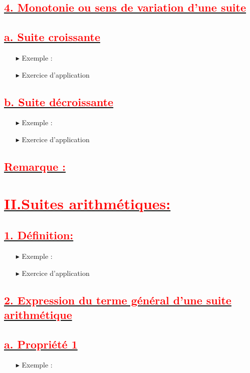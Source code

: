 \documentclass[12pt]{article}
\begin{document}
\subsection*{\underline{\textbf{\textcolor{red}{4. Monotonie ou sens de variation d’une suite}}}}
\subsection*{\underline{\textbf{\textcolor{red}{a. Suite croissante}}}}
\begin{itemize}
\item[$\blacktriangleright$] Exemple :
\item[$\blacktriangleright$] Exercice d’application
\end{itemize}
\subsection*{\underline{\textbf{\textcolor{red}{b. Suite décroissante}}}}
\begin{itemize}
\item[$\blacktriangleright$] Exemple :
\item[$\blacktriangleright$] Exercice d’application
\end{itemize}
\subsection*{\underline{\textbf{\textcolor{red}{Remarque :}}}}
\section*{\underline{\textbf{\textcolor{red}{II.Suites arithmétiques:}}}}
\subsection*{\underline{\textbf{\textcolor{red}{1. Définition:}}}}
\begin{itemize}
\item[$\blacktriangleright$] Exemple :
\item[$\blacktriangleright$] Exercice d’application
\end{itemize}
\subsection*{\underline{\textbf{\textcolor{red}{2. Expression du terme général d’une suite arithmétique}}}}
\subsection*{\underline{\textbf{\textcolor{red}{a. Propriété 1}}}}
\begin{itemize}
\item[$\blacktriangleright$] Exemple :
\end{itemize}
\end{document}
